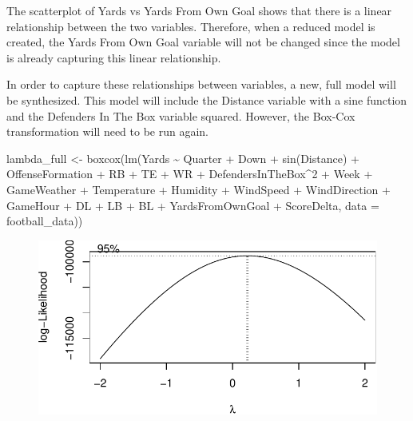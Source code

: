 \documentclass[
  super,
  preprint,
  3p]{elsarticle}
\newenvironment{Shaded}{\begin{snugshade}}{\end{snugshade}}
\newcommand{\AttributeTok}[1]{\textcolor[rgb]{0.40,0.45,0.13}{#1}}
\newcommand{\DecValTok}[1]{\textcolor[rgb]{0.68,0.00,0.00}{#1}}
\newcommand{\FunctionTok}[1]{\textcolor[rgb]{0.28,0.35,0.67}{#1}}
\newcommand{\NormalTok}[1]{\textcolor[rgb]{0.00,0.23,0.31}{#1}}
\newcommand{\OtherTok}[1]{\textcolor[rgb]{0.00,0.23,0.31}{#1}}
\newcommand{\SpecialCharTok}[1]{\textcolor[rgb]{0.37,0.37,0.37}{#1}}
\begin{document}
The scatterplot of Yards vs Yards From Own Goal shows that there is a
linear relationship between the two variables. Therefore, when a reduced
model is created, the Yards From Own Goal variable will not be changed
since the model is already capturing this linear relationship.

In order to capture these relationships between variables, a new, full
model will be synthesized. This model will include the Distance variable
with a sine function and the Defenders In The Box variable squared.
However, the Box-Cox transformation will need to be run again.

\begin{Shaded}
\begin{Highlighting}[]
\NormalTok{lambda\_full }\OtherTok{\textless{}{-}} \FunctionTok{boxcox}\NormalTok{(}\FunctionTok{lm}\NormalTok{(Yards }\SpecialCharTok{\textasciitilde{}}\NormalTok{ Quarter }\SpecialCharTok{+}\NormalTok{ Down }\SpecialCharTok{+} \FunctionTok{sin}\NormalTok{(Distance) }\SpecialCharTok{+}\NormalTok{ OffenseFormation }\SpecialCharTok{+}\NormalTok{ RB }\SpecialCharTok{+}\NormalTok{ TE }\SpecialCharTok{+}\NormalTok{ WR }\SpecialCharTok{+}\NormalTok{ DefendersInTheBox}\SpecialCharTok{\^{}}\DecValTok{2} \SpecialCharTok{+}\NormalTok{ Week }\SpecialCharTok{+}\NormalTok{ GameWeather }\SpecialCharTok{+}\NormalTok{ Temperature }\SpecialCharTok{+}\NormalTok{ Humidity }\SpecialCharTok{+}\NormalTok{ WindSpeed }\SpecialCharTok{+}\NormalTok{ WindDirection }\SpecialCharTok{+}\NormalTok{ GameHour }\SpecialCharTok{+}\NormalTok{ DL }\SpecialCharTok{+}\NormalTok{ LB }\SpecialCharTok{+}\NormalTok{ BL }\SpecialCharTok{+}\NormalTok{ YardsFromOwnGoal }\SpecialCharTok{+}\NormalTok{ ScoreDelta, }\AttributeTok{data =}\NormalTok{ football\_data))}
\end{Highlighting}
\end{Shaded}

\begin{figure}[H]

{\centering \includegraphics{project_report_files/figure-pdf/unnamed-chunk-13-1.pdf}

}

\end{figure}
\end{document}
